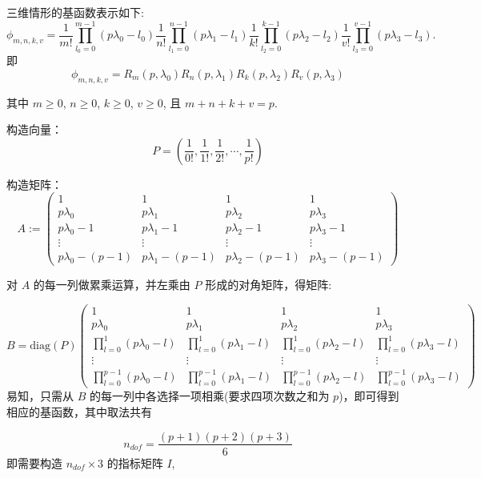 \documentclass[12pt,a4paper]{article}
\begin{document}
三维情形的基函数表示如下:
$$
\phi_{m,n,k,v} = \frac{1}{m!}\prod_{l_0 = 0}^{m - 1}
(p\lambda_0 -l_0)\frac{1}{n!}\prod_{l_1 = 0}^{n-1}(p\lambda_1 -
l_1)\frac{1}{k!}\prod_{l_2=0}^{k-1}(p\lambda_2 -l_2)\frac{1}{v!}\prod_{l_3=0}^{v-1}(p\lambda_3 - l_3).
$$
即
$$
\phi_{m,n,k,v} =R_m (p,\lambda_0)R_n (p,\lambda_1)R_k (p,\lambda_2)R_v (p,\lambda_3)
$$



其中 $ m\geq 0$, $n\geq 0$, $ k \geq 0$, $v\geq 0$,  且 $m+n+k+v=p$.

构造向量：
$$
P = ( \frac{1}{0!},  \frac{1}{1!}, \frac{1}{2!}, \cdots, \frac{1}{p!})
$$

构造矩阵：
$$
A :=                                                                            
\begin{pmatrix}  
1  &  1  & 1 & 1\\
p\lambda_0 & p\lambda_1 & p\lambda_2 & p\lambda_3\\                                             
p\lambda_0 - 1 & p\lambda_1 - 1 & p\lambda_2 - 1 & p\lambda_3 - 1\\   
\vdots & \vdots & \vdots & \vdots \\                                                     
p\lambda_0 - (p - 1) & p\lambda_1 - (p - 1) & p\lambda_2 - (p - 1) & p\lambda_3 - (p - 1)
\end{pmatrix}                                                                   
$$ 

对 $A$ 的每一列做累乘运算，并左乘由 $P$ 形成的对角矩阵，得矩阵:

$$
B = \mathrm{diag}(P)
\begin{pmatrix}
1 & 1 & 1 & 1\\
p\lambda_0 & p\lambda_1 & p\lambda_2 & p\lambda_3\\
\prod_{l=0}^{1}(p\lambda_0 - l) & \prod_{l=0}^{1}(p\lambda_1 - l)
& \prod_{l=0}^{1}(p\lambda_2 - l) & \prod_{l=0}^{1}(p\lambda_3 - l) \\
\vdots & \vdots & \vdots & \vdots \\
\prod_{l=0}^{p-1}(p\lambda_0 -l) & \prod_{l=0}^{p-1}(p\lambda_1 - l)
& \prod_{l=0}^{p-1}(p\lambda_2 - l) & \prod_{l=0}^{p-1}(p\lambda_3 - l) 
\end{pmatrix}
$$
易知，只需从 $B$ 的每一列中各选择一项相乘(要求四项次数之和为 $p$)，即可得到相应的基函数，其中取法共有 

$$
n_{dof} = \frac{(p+1)(p+2)(p+3)}{6}
$$
即需要构造 $n_{dof}\times 3$ 的指标矩阵 $I$, 
\end{document}
